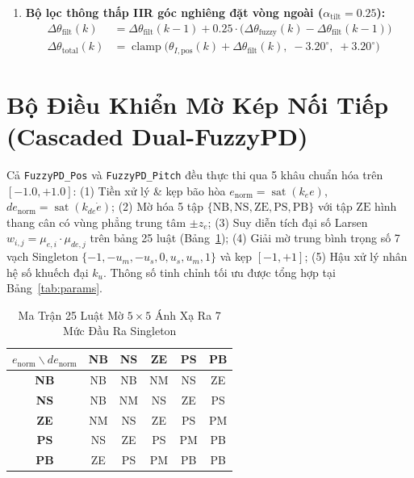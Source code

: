 \documentclass[10pt,a4paper,twocolumn]{article}
\begin{document}
\begin{enumerate}
    \begin{equation}
        \theta_{I,\text{pos}}(k) = \operatorname{clamp}\!\big(\theta_{I,\text{pos}}(k-1) - 0.004 \cdot \operatorname{clamp}(s_{\text{pos}}, -4, 4) \cdot dt,\; \pm 1.20^\circ\big)
    \end{equation}
    \item \textbf{Bộ lọc thông thấp IIR góc nghiêng đặt vòng ngoài ($\alpha_{\text{tilt}} = 0.25$):}
    \begin{align}
        \Delta\theta_{\text{filt}}(k) &= \Delta\theta_{\text{filt}}(k-1) + 0.25 \cdot \big(\Delta\theta_{\text{fuzzy}}(k) - \Delta\theta_{\text{filt}}(k-1)\big) \\
        \Delta\theta_{\text{total}}(k) &= \operatorname{clamp}\!\big(\theta_{I,\text{pos}}(k) + \Delta\theta_{\text{filt}}(k),\; -3.20^\circ,\; +3.20^\circ\big)
    \end{align}
\end{enumerate}

\section{Bộ Điều Khiển Mờ Kép Nối Tiếp (Cascaded Dual-FuzzyPD)}
Cả \texttt{FuzzyPD\_Pos} và \texttt{FuzzyPD\_Pitch} đều thực thi qua 5 khâu chuẩn hóa trên $[-1.0, +1.0]$: (1) Tiền xử lý \& kẹp bão hòa $e_{\text{norm}} = \operatorname{sat}(k_e e)$, $de_{\text{norm}} = \operatorname{sat}(k_{de}\dot{e})$; (2) Mờ hóa 5 tập $\{\text{NB}, \text{NS}, \text{ZE}, \text{PS}, \text{PB}\}$ với tập $\text{ZE}$ hình thang cân có vùng phẳng trung tâm $\pm z_e$; (3) Suy diễn tích đại số Larsen $w_{i,j} = \mu_{e,i} \cdot \mu_{de,j}$ trên bảng 25 luật (Bảng~\ref{tab:rules}); (4) Giải mờ trung bình trọng số 7 vạch Singleton $\{-1, -u_m, -u_s, 0, u_s, u_m, 1\}$ và kẹp $[-1, +1]$; (5) Hậu xử lý nhân hệ số khuếch đại $k_u$. Thông số tinh chỉnh tối ưu được tổng hợp tại Bảng~\ref{tab:params}.

\begin{table}[htbp]
\centering
\caption{Ma Trận 25 Luật Mờ $5 \times 5$ Ánh Xạ Ra 7 Mức Đầu Ra Singleton}
\label{tab:rules}
\footnotesize
\begin{tabular}{c|ccccc}
\toprule
$e_{\text{norm}} \backslash de_{\text{norm}}$ & \textbf{NB} & \textbf{NS} & \textbf{ZE} & \textbf{PS} & \textbf{PB} \\
\midrule
\textbf{NB} & NB & NB & NM & NS & ZE \\
\textbf{NS} & NB & NM & NS & ZE & PS \\
\textbf{ZE} & NM & NS & ZE & PS & PM \\
\textbf{PS} & NS & ZE & PS & PM & PB \\
\textbf{PB} & ZE & PS & PM & PB & PB \\
\bottomrule
\end{tabular}
\end{table}
\end{document}
